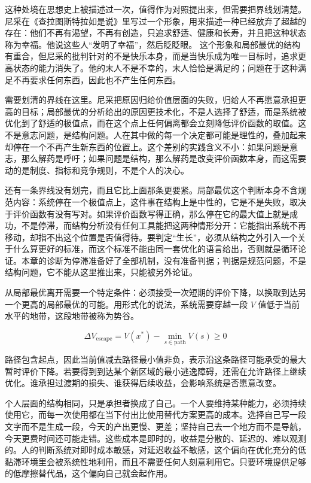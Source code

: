 
这种处境在思想史上被描述过一次，值得作为对照提出来，但需要把界线划清楚。尼采在《查拉图斯特拉如是说》里写过一个形象，用来描述一种已经放弃了超越的存在：他们不再有渴望，不再有创造，只追求舒适、健康和长寿，并且把这种状态称为幸福。他说这些人“发明了幸福”，然后眨眨眼。\cite{nietzsche1883zarathustra} 这个形象和局部最优的结构有重合，但尼采的批判针对的不是快乐本身，而是当快乐成为唯一目标时，追求更高状态的能力消失了。他的末人不是不幸的，末人恰恰是满足的；问题在于这种满足不再要求任何东西，因此也不产生任何东西。

需要划清的界线在这里。尼采把原因归给价值层面的失败，归给人不再愿意承担更高的目标；局部最优的分析给出的原因更技术化，不是人选择了舒适，而是系统被优化到了舒适的极值点，而在这个点上任何偏离都会立刻降低评价函数的取值。这不是意志问题，是结构问题。人在其中做的每一个决定都可能是理性的，叠加起来却停在一个不再产生新东西的位置上。这个差别的实践含义不小：如果问题是意志，那么解药是呼吁；如果问题是结构，那么解药是改变评价函数本身，而这需要动的是制度、指标和竞争规则，不是个人的决心。

还有一条界线没有划完，而且它比上面那条更要紧。局部最优这个判断本身不含规范内容：系统停在一个极值点上，这件事在结构上是中性的，它是不是失败，取决于评价函数有没有写对。如果评价函数写得正确，那么停在它的最大值上就是成功，不是停滞，而结构分析没有任何工具能把这两种情形分开：它能指出系统不再移动，却指不出这个位置是否值得待。要判定“生长”，必须从结构之外引入一个关于什么算更好的标准，而这个标准不能由同一套优化的语言给出，否则就是循环论证。本章的诊断为停滞准备好了全部机制，没有准备判据；判据是规范问题，不是结构问题，它不能从这里推出来，只能被另外论证。


从局部最优离开需要一个特定条件：必须接受一次短期的评价下降，以换取到达另一个更高的局部最优的可能。用形式化的说法，系统需要穿越一段 $V$ 值低于当前水平的地带，这段地带被称为势谷。

\begin{equation}
\Delta V_{\text{escape}} = V(x^*) - \min_{s \in \text{path}} V(s) \ge 0
\label{eq:ch40-escape}
\end{equation}

路径包含起点，因此当前值减去路径最小值非负，表示沿这条路径可能承受的最大暂时评价下降。若要得到到达某个新区域的最小逃逸障碍，还需在允许路径上继续优化。谁承担过渡期的损失、谁获得后续收益，会影响系统是否愿意改变。

个人层面的结构相同，只是承担者换成了自己。一个人要维持某种能力，必须持续使用它，而每一次使用都在当下付出比使用替代方案更高的成本。选择自己写一段文字而不是生成一段，今天的产出更慢、更差；坚持自己去一个地方而不是导航，今天更费时间还可能走错。这些成本是即时的，收益是分散的、延迟的、难以观测的。人的判断系统对即时成本敏感，对延迟收益不敏感，这个偏向在优化充分的低黏滞环境里会被系统性地利用，而且不需要任何人刻意利用它。只要环境提供足够的低摩擦替代品，这个偏向自己就会起作用。

